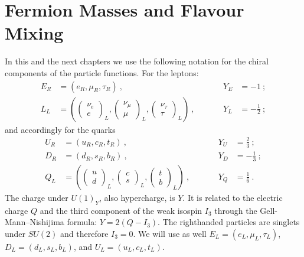 \section{Fermion Masses and Flavour Mixing}
In this and the next chapters we use the following notation for the chiral components of the particle functions. For the leptons:
\begin{align}
	E_R &= (e_R,\mu_R,\tau_R) \ , &&\quad &Y_E &= -1 \ ; \\
	L_L &= \left(\begin{pmatrix} \nu_e \\ e \end{pmatrix}_L,
	\begin{pmatrix} \nu_\mu \\ \mu \end{pmatrix}_L,
	\begin{pmatrix} \nu_\tau \\ \tau \end{pmatrix}_L\right) \ , &&\quad &Y_L &= -\frac{1}{2} \ ;
\end{align}
and accordingly for the quarks
\begin{align}
	U_R &= (u_R,c_R,t_R) \ , &&\quad &Y_U &= \frac{2}{3} \ ; \\
	D_R &= (d_R,s_R,b_R) \ , &&\quad &Y_D &= -\frac{1}{3} \ ; \\
	Q_L &= \left(\begin{pmatrix} u \\ d \end{pmatrix}_L,
	\begin{pmatrix} c \\ s \end{pmatrix}_L,
	\begin{pmatrix} t \\ b \end{pmatrix}_L\right) \ , &&\quad &Y_Q &= \frac{1}{6} \ .	
\end{align}
The charge under $U(1)_Y$, also hypercharge, is $Y$. It is related to the electric charge $Q$ and the third component of the weak isospin $I_3$ through the Gell-Mann–Nishijima formula: $Y = 2(Q-I_3)$. The righthanded particles are singlets under $SU(2)$ and therefore $I_3=0$. We will use as well $E_L = (e_L,\mu_L,\tau_L)$, $D_L = (d_L,s_L,b_L)$, and $U_L = (u_L,c_L,t_L)$.



